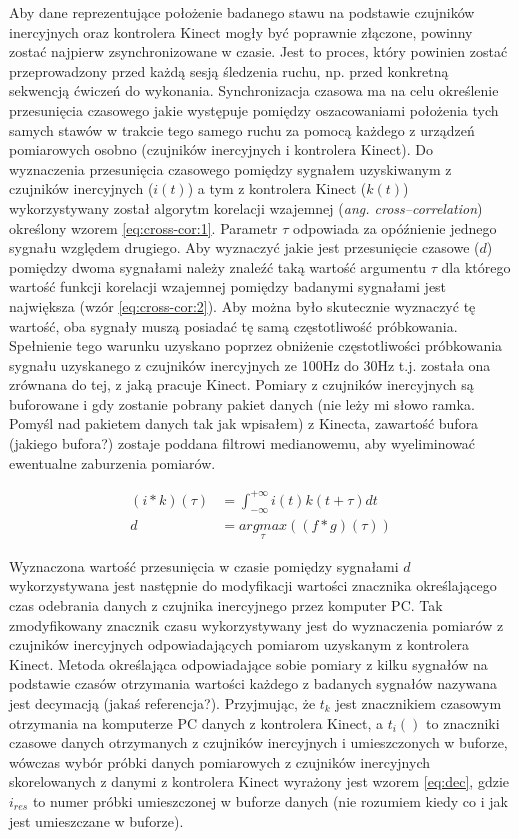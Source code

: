 Aby dane reprezentujące położenie badanego stawu na podstawie czujników inercyjnych oraz kontrolera Kinect mogły być poprawnie złączone, powinny zostać najpierw zsynchronizowane w czasie. Jest to proces, który powinien zostać przeprowadzony przed każdą sesją śledzenia ruchu, np. przed konkretną sekwencją ćwiczeń do wykonania. Synchronizacja czasowa ma na celu określenie przesunięcia czasowego jakie występuje pomiędzy oszacowaniami położenia tych samych stawów w trakcie tego samego ruchu za pomocą każdego z urządzeń pomiarowych osobno (czujników inercyjnych i kontrolera Kinect). Do wyznaczenia przesunięcia czasowego pomiędzy sygnałem uzyskiwanym z czujników inercyjnych ($i(t)$) a tym z kontrolera Kinect ($k(t)$) wykorzystywany został algorytm korelacji wzajemnej (\emph{ang. cross--correlation}) określony wzorem \eqref{eq:cross-cor:1}. Parametr $\tau$ odpowiada za opóźnienie jednego sygnału względem drugiego. Aby wyznaczyć jakie jest przesunięcie czasowe ($d$) pomiędzy dwoma sygnałami należy znaleźć taką wartość argumentu $\tau$ dla którego wartość funkcji korelacji wzajemnej pomiędzy badanymi sygnałami jest największa (wzór \eqref{eq:cross-cor:2}). Aby można było skutecznie wyznaczyć tę wartość, oba sygnały muszą posiadać tę samą częstotliwość próbkowania. Spełnienie tego warunku uzyskano poprzez obniżenie częstotliwości próbkowania sygnału uzyskanego z czujników inercyjnych ze 100Hz  do 30Hz t.j. została ona zrównana do tej, z jaką pracuje Kinect. Pomiary z czujników inercyjnych są buforowane i gdy zostanie pobrany pakiet danych (nie leży mi słowo ramka. Pomyśl nad pakietem danych tak jak wpisałem) z Kinecta, zawartość bufora (jakiego bufora?) zostaje poddana filtrowi medianowemu, aby wyeliminować ewentualne zaburzenia pomiarów. 

\begin{subequations}
	\begin{align}
		(i \ast k)(\tau) & = \int_{-\infty}^{+\infty}i(t)k(t+\tau)dt\label{eq:cross-cor:1}   \\
		d                & = \underset{\tau}{argmax}((f \ast g)(\tau))\label{eq:cross-cor:2} 
	\end{align}
	\label{eq:cross-cor}
\end{subequations}

Wyznaczona wartość przesunięcia w czasie pomiędzy sygnałami $d$ wykorzystywana jest następnie do modyfikacji wartości znacznika określającego czas odebrania danych z czujnika inercyjnego przez komputer PC. Tak zmodyfikowany znacznik czasu wykorzystywany jest do wyznaczenia pomiarów z czujników inercyjnych odpowiadających pomiarom uzyskanym z kontrolera Kinect. Metoda określająca odpowiadające sobie pomiary z kilku sygnałów na podstawie czasów otrzymania wartości każdego z badanych sygnałów nazywana jest decymacją (jakaś referencja?). Przyjmując, że $t_k$ jest znacznikiem czasowym otrzymania na komputerze PC danych z kontrolera Kinect, a $t_i()$ to znaczniki czasowe danych  otrzymanych z czujników inercyjnych i umieszczonych w buforze, wówczas wybór próbki danych pomiarowych z czujników inercyjnych skorelowanych z danymi z kontrolera Kinect wyrażony jest wzorem \eqref{eq:dec}, gdzie $i_{res}$ to numer próbki umieszczonej w buforze danych (nie rozumiem kiedy co i jak jest umieszczane w buforze).

